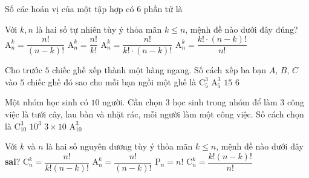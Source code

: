 \begin{ex}%
	Số các hoán vị của một tập hợp có $6$ phần tử là
\end{ex}%
\begin{ex}%
Với $k,n$ là hai số tự nhiên tùy ý thỏa mãn $k\le n$, mệnh đề nào dưới đây đúng?
	\choice
	{\True $\mathrm{A}_n^k=\dfrac{n!}{(n-k)!}$}
	{  $\mathrm{A}_n^k=\dfrac{n!}{k!}$}
	{ $\mathrm{A}_n^k=\dfrac{n!}{k! \cdot (n-k)!}$}
	{ $\mathrm{A}_n^k=\dfrac{k!\cdot (n-k)!}{n!}$}
\end{ex}%
\begin{ex}%
	Cho trước $5$ chiếc ghế xếp thành một hàng ngang. Số cách xếp ba bạn $A$, $B$, $C$ vào $5$ chiếc ghế đó sao cho mỗi bạn ngồi một ghế là
	\choice
	{$\mathrm{C}_5^3$}
	{\True $\mathrm{A}_5^3$}
	{$15$}
	{$6$}
\end{ex}%
\begin{ex}%
	Một nhóm học sinh có $10$ người. Cần chọn $3$ học sinh trong nhóm để làm $3$ công việc là tưới cây, lau bàn và nhặt rác, mỗi người làm một công việc. Số cách chọn là
	\choice
	{$\mathrm{C}_{10}^3$}
	{$10^3$}
	{$3\times 10$}
	{\True $\mathrm{A}_{10}^3$}
\end{ex}%
\begin{ex}%
	Với $k$ và $n$ là hai số nguyên dương tùy ý thỏa mãn $k\le n$, mệnh đề nào dưới đây \textbf{sai}?
	\choice
	{$\mathrm{C}_n^k=\dfrac{n!}{k!(n-k)!}$}
	{$\mathrm{A}_n^k=\dfrac{n!}{(n-k)!}$}
	{$\mathrm{P}_n=n!$}
	{\True $\mathrm{C}_n^k=\dfrac{k!(n-k)!}{n!}$}
\end{ex}%
